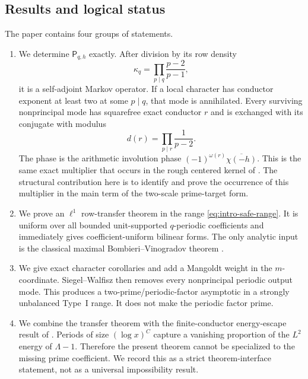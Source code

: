 \subsection{Results and logical status}

The paper contains four groups of statements.

\begin{enumerate}[label=\textup{(\roman*)}]
 \item We determine $\mathsf P_{q,h}$ exactly.  After division by its row
 density
 \begin{equation}\label{eq:intro-kappa}
  \kappa_q=\prod_{p\mid q}\frac{p-2}{p-1},
 \end{equation}
 it is a self-adjoint Markov operator.  If a local character has conductor
 exponent at least two at some $p\mid q$, that mode is annihilated.  Every
 surviving nonprincipal mode has squarefree exact conductor $r$ and is
 exchanged with its conjugate with modulus
 \begin{equation}\label{eq:intro-damping}
  d(r)=\prod_{p\mid r}\frac1{p-2}.
 \end{equation}
 The phase is the arithmetic involution phase
 $(-1)^{\omega(r)}\overline{\chi(-h)}$.  This is the same exact multiplier
 that occurs in the rough centered kernel of
 \citet{WangTPCFive2026}.  The structural contribution here is to identify
 and prove the occurrence of this multiplier in the main term of the
 two-scale prime-target form.

 \item We prove an $\ell^1$ row-transfer theorem in the range
 \eqref{eq:intro-safe-range}.  It is uniform over all bounded unit-supported
 $q$-periodic coefficients and immediately gives coefficient-uniform
 bilinear forms.  The only analytic input is the classical maximal
 Bombieri--Vinogradov theorem
 \citep{Bombieri1965,Vinogradov1965,IwaniecKowalski2004}.

 \item We give exact character corollaries and add a Mangoldt weight in the
 $m$-coordinate.  Siegel--Walfisz then removes every nonprincipal periodic
 output mode.  This produces a two-prime/periodic-factor asymptotic in a
 strongly unbalanced Type~I range.  It does not make the periodic factor
 prime.

 \item We combine the transfer theorem with the finite-conductor
 energy-escape result of \citet{WangTPCSeven2026}.  Periods of size
 $(\log x)^C$ capture a vanishing proportion of the $L^2$ energy of
 $\Lambda-1$.  Therefore the present theorem cannot be specialized to the
 missing prime coefficient.  We record this as a strict theorem-interface
 statement, not as a universal impossibility result.
\end{enumerate}

